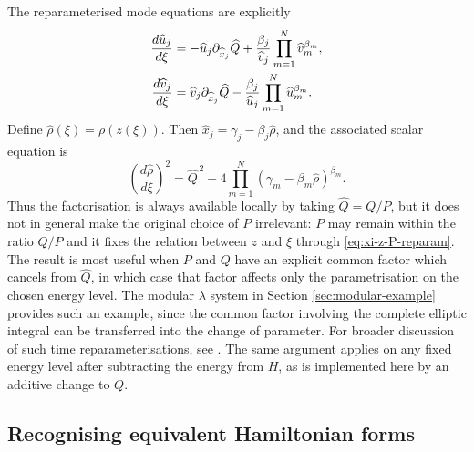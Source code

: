\documentclass[11pt,a4paper]{article}
\numberwithin{equation}{section}
\begin{document}
The reparameterised mode equations are explicitly
\begin{align}
    \frac{d\widehat{u}_j}{d\xi}
    &=-\widehat{u}_j\partial_{\widehat{x}_j}\widehat{Q}
    +\frac{\beta_j}{\widehat{v}_j}
    \prod_{m=1}^{N}\widehat{v}_m^{\beta_m},
    \notag\\
    \frac{d\widehat{v}_j}{d\xi}
    &=\widehat{v}_j\partial_{\widehat{x}_j}\widehat{Q}
    -\frac{\beta_j}{\widehat{u}_j}
    \prod_{m=1}^{N}\widehat{u}_m^{\beta_m}.
    \label{eq:Hhat-reparameterised-modes}
\end{align}
Define $\widehat{\rho}(\xi)=\rho(z(\xi))$. Then $\widehat{x}_j=\gamma_j-\beta_j\widehat{\rho}$, and the associated scalar equation is
\begin{equation}
    \left(\frac{d\widehat{\rho}}{d\xi}\right)^2
    =\widehat{Q}^{\,2}
    -4\prod_{m=1}^{N}
    \left(\gamma_m-\beta_m\widehat{\rho}\right)^{\beta_m}.
    \label{eq:Hhat-reparameterised-rho}
\end{equation}
Thus the factorisation is always available locally by taking $\widehat{Q}=Q/P$, but it does not in general make the original choice of $P$ irrelevant: $P$ may remain within the ratio $Q/P$ and it fixes the relation between $z$ and $\xi$ through \eqref{eq:xi-z-P-reparam}.
The result is most useful when $P$ and $Q$ have an explicit common factor which cancels from $\widehat{Q}$, in which case that factor affects only the parametrisation on the chosen energy level.
The modular $\lambda$ system in Section \ref{sec:modular-example} provides such an example, since the common factor involving the complete elliptic integral can be transferred into the change of parameter.
For broader discussion of such time reparameterisations, see \cite{garcia-naranjoStructurePreservingDiscretization2020}.
The same argument applies on any fixed energy level after subtracting the energy from $H$, as is implemented here by an additive change to $Q$.


\subsection{Recognising equivalent Hamiltonian forms}
\label{sec:equivalent-mixing-functions}
\end{document}
